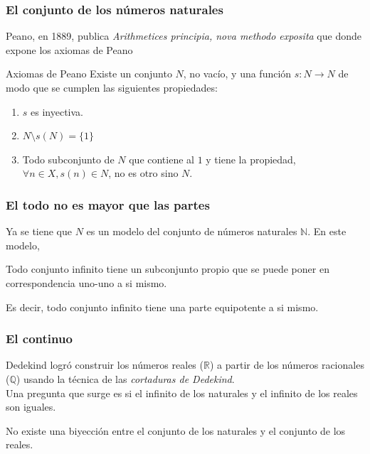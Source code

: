\begin{frame}
 \frametitle{El conjunto de los números naturales}

\justify
Peano, en 1889, publica \textit{Arithmetices principia, nova methodo exposita} que donde expone los axiomas de Peano\\
 
\begin{block}{Axiomas de Peano}
 Existe un conjunto $N$, no vacío, y una función $s:N \to N$ de modo que se cumplen las siguientes propiedades:
 
 \pause
 \begin{enumerate}
  \item $s$ es inyectiva.
  \item $N\setminus s(N) = \{1\}$ %
  \item Todo subconjunto de $N$ que contiene al $1$ y tiene la propiedad, $\forall n\in X, s(n)\in N$, no es otro sino $N$.
 \end{enumerate}
 \end{block}
\end{frame}

\begin{frame}
 \frametitle{El todo no es mayor que las partes}

\justify
Ya se tiene que $N$ es un modelo del conjunto de números naturales $\mathbb{N}$. En este modelo,
\begin{theorem}[Infinitud]
 Todo conjunto infinito tiene un subconjunto propio que se puede poner en correspondencia uno-uno a si mismo.
\end{theorem}

\pause
Es decir, todo conjunto infinito tiene una parte equipotente a si mismo.
\end{frame}

\begin{frame}
 \frametitle{El continuo}
 Dedekind logró construir los números reales ($\mathbb{R}$) a partir de los números racionales ($\mathbb{Q}$) usando la técnica de las \textit{cortaduras de Dedekind}.\\
 
 \pause
 {\color{red} Una pregunta que surge es si el infinito de los naturales y el infinito de los reales son iguales.}
 
 \pause
 \begin{theorem}[El continuo]
  No existe una biyección entre el conjunto de los naturales y el conjunto de los reales.
 \end{theorem}
\end{frame}


